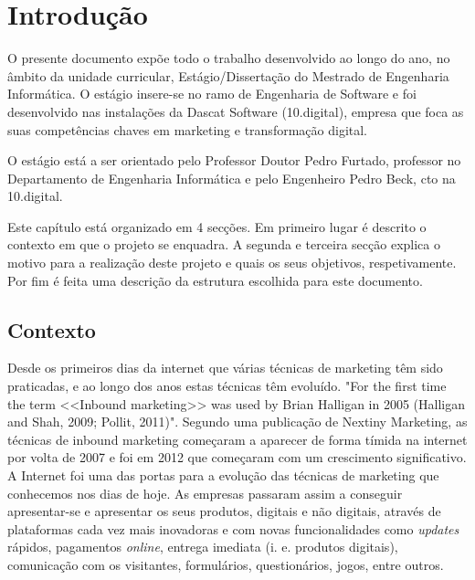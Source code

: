 \chapter{Introdução}
\label{sec:introducao}

O presente documento expõe todo o trabalho desenvolvido ao longo do ano, no âmbito da unidade curricular, Estágio/Dissertação do Mestrado de Engenharia Informática. O estágio insere-se no ramo de Engenharia de Software e foi desenvolvido nas instalações da Dascat Software (10.digital)\cite{10}, empresa que foca as suas competências chaves em marketing e transformação digital. 

O estágio está a ser orientado pelo Professor Doutor Pedro Furtado, professor no Departamento de Engenharia Informática e pelo Engenheiro Pedro Beck, \acrshort{cto} na 10.digital.

Este capítulo está organizado em 4 secções. Em primeiro lugar é descrito o contexto em que o projeto se enquadra. A segunda e terceira secção explica o motivo para a realização deste projeto e quais os seus objetivos, respetivamente. Por fim é feita uma descrição da estrutura escolhida para este documento.

\section{Contexto}
\label{subsec:contexto}

Desde os primeiros dias da internet que várias técnicas de marketing têm sido praticadas, e ao longo dos anos estas técnicas têm evoluído. "For the first time the term <<Inbound marketing>> was used by Brian Halligan in 2005 (Halligan and Shah, 2009; Pollit, 2011)"\cite{bookinbound}\cite{inbound_paper}. Segundo uma publicação de Nextiny Marketing\cite{postNextiny}, as técnicas de inbound marketing começaram a aparecer de forma tímida na internet por volta de 2007 e foi em 2012 que começaram com um crescimento significativo. A Internet foi uma das portas para a evolução das técnicas de marketing que conhecemos nos dias de hoje. As empresas passaram assim a conseguir apresentar-se e apresentar os seus produtos, digitais e não digitais, através de plataformas cada vez mais inovadoras e com novas funcionalidades como \textit{updates} rápidos, pagamentos \textit{online}, entrega imediata (i. e. produtos digitais), comunicação com os visitantes, formulários, questionários, jogos, entre outros.  

